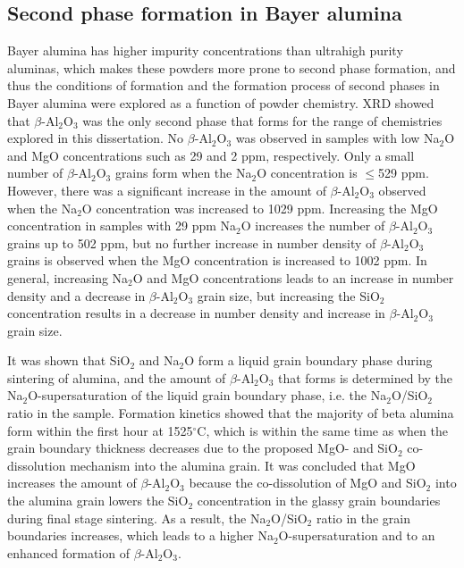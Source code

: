 \subsection{Second phase formation in Bayer alumina}
Bayer alumina has higher impurity concentrations than ultrahigh purity aluminas, which makes these powders more prone to second phase formation, and thus the conditions of formation and the formation process of second phases in Bayer alumina were explored as a function of powder chemistry. XRD showed that $\beta$-Al$_{2}$O$_{3}$ was the only second phase that forms for the range of chemistries explored in this dissertation. No $\beta$-Al$_{2}$O$_{3}$ was observed in samples with low Na$_{2}$O and MgO concentrations such as 29 and 2 ppm, respectively. Only a small number of $\beta$-Al$_{2}$O$_{3}$ grains form when the Na$_{2}$O concentration is $\leq$529 ppm. However, there was a significant increase in the amount of $\beta$-Al$_{2}$O$_{3}$ observed when the Na$_{2}$O concentration was increased to 1029 ppm. Increasing the MgO concentration in samples with 29 ppm Na$_{2}$O increases the number of $\beta$-Al$_{2}$O$_{3}$ grains up to 502 ppm, but no further increase in number density of $\beta$-Al$_{2}$O$_{3}$ grains is observed when the MgO concentration is increased to 1002 ppm. In general, increasing Na$_{2}$O and MgO concentrations leads to an increase in number density and a decrease in $\beta$-Al$_{2}$O$_{3}$ grain size, but increasing the SiO$_{2}$ concentration results in a decrease in number density and increase in $\beta$-Al$_{2}$O$_{3}$ grain size. 

It was shown that SiO$_{2}$ and Na$_{2}$O form a liquid grain boundary phase during sintering of alumina, and the amount of $\beta$-Al$_{2}$O$_{3}$ that forms is determined by the Na$_{2}$O-supersaturation of the liquid grain boundary phase, i.e. the Na$_{2}$O/SiO$_{2}$ ratio in the sample. Formation kinetics showed that the majority of beta alumina form within the first hour at 1525$^{\circ}$C, which is within the same time as when the grain boundary thickness decreases due to the proposed MgO- and SiO$_{2}$ co-dissolution mechanism into the alumina grain. It was concluded that MgO increases the amount of $\beta$-Al$_{2}$O$_{3}$ because the co-dissolution of MgO and SiO$_{2}$ into the alumina grain lowers the SiO$_{2}$ concentration in the glassy grain boundaries during final stage sintering. As a result, the Na$_{2}$O/SiO$_{2}$ ratio in the grain boundaries increases, which leads to a higher Na$_{2}$O-supersaturation and to an enhanced formation of $\beta$-Al$_{2}$O$_{3}$. 

